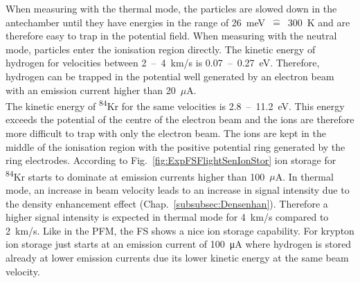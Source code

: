 		When measuring with the thermal mode, the particles are slowed down in the antechamber until they have energies in the range of 26~meV~$\widehat{=}$~300~K and are therefore easy to trap in the potential field. When measuring with the neutral mode, particles enter the ionisation region directly. The kinetic energy of hydrogen for velocities between 2~--~4~km/s is 0.07~--~0.27~eV. Therefore, hydrogen can be trapped in the potential well generated by an electron beam with an emission current higher than 20~$\mu$A.\\
		The kinetic energy of \textsuperscript{84}Kr for the same velocities is 2.8~--~11.2~eV. This energy exceeds the potential of the centre of the electron beam and the ions are therefore more difficult to trap with only the electron beam. The ions are kept in the middle of the ionisation region with the positive potential ring generated by the ring electrodes. According to Fig.~\ref{fig:ExpFSFlightSenIonStor} ion storage for \textsuperscript{84}Kr starts to dominate at emission currents higher than 100~$\mu$A. In thermal mode, an increase in beam velocity leads to an increase in signal intensity due to the density enhancement effect (Chap.~\ref{subsubsec:Densenhan}). Therefore a higher signal intensity is expected in thermal mode for 4~km/s compared to 2~km/s. Like in the PFM, the FS shows a nice ion storage capability. For krypton ion storage just starts at an emission current of 100~\si{\micro\ampere} where hydrogen is stored already at lower emission currents due its lower kinetic energy at the same beam velocity.\\
